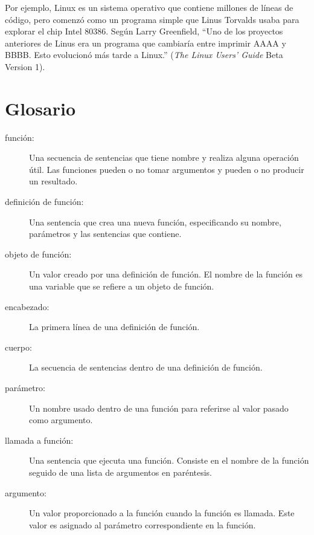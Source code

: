 \documentclass[10pt]{book}
\begin{document}
Por ejemplo, Linux es un sistema operativo que contiene millones de
líneas de código, pero comenzó como un programa simple que Linus Torvalds
usaba para explorar el chip Intel 80386.  Según Larry Greenfield,
``Uno de los proyectos anteriores de Linus era un programa que cambiaría
entre imprimir AAAA y BBBB.  Esto evolucionó más tarde a Linux.''
({\em The Linux Users' Guide} Beta Version 1).


\section{Glosario}

\begin{description}

\item[función:] Una secuencia de sentencias que tiene nombre y realiza alguna
operación útil.  Las funciones pueden o no tomar argumentos y pueden o no
producir un resultado.

\item[definición de función:]  Una sentencia que crea una nueva función,
especificando su nombre, parámetros y las sentencias que contiene.

\item[objeto de función:]  Un valor creado por una definición de función.
El nombre de la función es una variable que se refiere a un objeto
de función.

\item[encabezado:] La primera línea de una definición de función.

\item[cuerpo:] La secuencia de sentencias dentro de una definición de función.

\item[parámetro:] Un nombre usado dentro de una función para referirse al valor
pasado como argumento.

\item[llamada a función:] Una sentencia que ejecuta una función.
Consiste en el nombre de la función seguido de una lista de argumentos en
paréntesis.

\item[argumento:]  Un valor proporcionado a la función cuando la función es llamada.
Este valor es asignado al parámetro correspondiente en la función.


\end{description}
\end{document}
